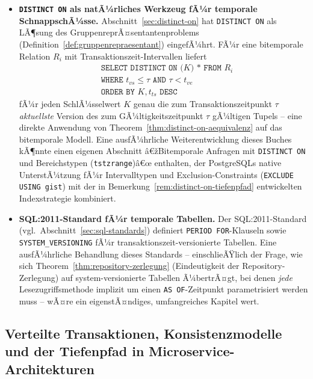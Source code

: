 ﻿\documentclass[a4paper,12pt]{report}
\theoremstyle{definition}
\theoremstyle{remark}
\begin{document}
\begin{itemize}
  \item \textbf{\texttt{DISTINCT ON} als natÃ¼rliches Werkzeug fÃ¼r
    temporale SchnappschÃ¼sse.} Abschnitt~\ref{sec:distinct-on} hat
    \texttt{DISTINCT ON} als LÃ¶sung des
    GruppenreprÃ¤sentantenproblems (Definition~\ref{def:gruppenrepraesentant})
    eingefÃ¼hrt. FÃ¼r eine bitemporale Relation $R_i$ mit
    Transaktionszeit-Intervallen liefert
    \begin{align*}
      &\texttt{SELECT DISTINCT ON (}K\texttt{) * FROM } R_i\\
      &\texttt{WHERE } t_{vs}\leq\tau \texttt{ AND } \tau < t_{ve}\\
      &\texttt{ORDER BY } K, t_{ts} \texttt{ DESC}
    \end{align*}
    fÃ¼r jeden SchlÃ¼sselwert $K$ genau die zum
    Transaktionszeitpunkt $\tau$ \emph{aktuellste} Version des zum
    GÃ¼ltigkeitszeitpunkt $\tau$ gÃ¼ltigen Tupels -- eine direkte
    Anwendung von Theorem~\ref{thm:distinct-on-aequivalenz} auf das
    bitemporale Modell. Eine ausfÃ¼hrliche Weiterentwicklung dieses
    Buches kÃ¶nnte einen eigenen Abschnitt â€žBitemporale Anfragen mit
    \texttt{DISTINCT ON} und Bereichstypen (\texttt{tstzrange})â€œ
    enthalten, der PostgreSQLs native UnterstÃ¼tzung fÃ¼r
    Intervalltypen und Exclusion-Constraints
    (\texttt{EXCLUDE USING gist}) mit der in
    Bemerkung~\ref{rem:distinct-on-tiefenpfad} entwickelten
    Indexstrategie kombiniert.

  \item \textbf{SQL:2011-Standard fÃ¼r temporale Tabellen.} Der
    SQL:2011-Standard (vgl.\ Abschnitt~\ref{sec:sql-standards})
    definiert \texttt{PERIOD FOR}-Klauseln sowie
    \texttt{SYSTEM\_VERSIONING} fÃ¼r transaktionszeit-versionierte
    Tabellen. Eine ausfÃ¼hrliche Behandlung dieses Standards --
    einschlieÃŸlich der Frage, wie sich
    Theorem~\ref{thm:repository-zerlegung} (Eindeutigkeit der
    Repository-Zerlegung) auf system-versionierte Tabellen Ã¼bertrÃ¤gt,
    bei denen \emph{jede} Lesezugriffsmethode implizit um einen
    \texttt{AS OF}-Zeitpunkt parametrisiert werden muss -- wÃ¤re ein
    eigenstÃ¤ndiges, umfangreiches Kapitel wert.
\end{itemize}

\subsection{Verteilte Transaktionen, Konsistenzmodelle und der Tiefenpfad in Microservice-Architekturen}
\label{sec:ausblick-verteilt}
\end{document}
